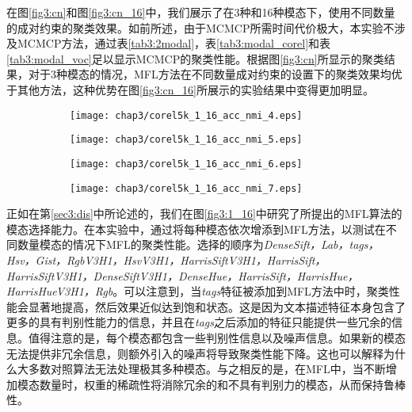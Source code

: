 在图\ref{fig3:cn}和图\ref{fig3:cn_16}中，我们展示了在3种和16种模态下，使用不同数量的成对约束的聚类效果。如前所述，由于MCMCP所需时间代价极大，本实验不涉及MCMCP方法，通过表\ref{tab3:2modal}，表\ref{tab3:modal_corel}和表\ref{tab3:modal_voc}足以显示MCMCP的聚类性能。根据图\ref{fig3:cn}所显示的聚类结果，对于3种模态的情况，MFL方法在不同数量成对约束的设置下的聚类效果均优于其他方法，这种优势在图\ref{fig3:cn_16}所展示的实验结果中变得更加明显。


\begin{figure}[t]
	\centering
	\begin{subfigure}{0.49\textwidth}
		\centering
		\texttt{[image: chap3/corel5k\_1\_16\_acc\_nmi\_4.eps]}
		\caption{}
		\label{fig3:1_16_acc_nmi_4}
	\end{subfigure}
	\begin{subfigure}{0.49\textwidth}
		\centering
		\texttt{[image: chap3/corel5k\_1\_16\_acc\_nmi\_5.eps]}
		\caption{}
		\label{fig3:1_16_acc_nmi_5}
    \end{subfigure}
    
	\centering
	\begin{subfigure}{0.49\textwidth}
		\centering
		\texttt{[image: chap3/corel5k\_1\_16\_acc\_nmi\_6.eps]}
		\caption{}
		\label{fig3:1_16_acc_nmi_6}
	\end{subfigure}
	\begin{subfigure}{0.49\textwidth}
		\centering
		\texttt{[image: chap3/corel5k\_1\_16\_acc\_nmi\_7.eps]}
		\caption{}
		\label{fig3:1_16_acc_nmi_7}
	\end{subfigure}
    \label{fig3:1_16_more}
\end{figure}

正如在第\ref{sec3:dis}中所论述的，我们在图\ref{fig3:1_16}中研究了所提出的MFL算法的模态选择能力。在本实验中，通过将每种模态依次增添到MFL方法，以测试在不同数量模态的情况下MFL的聚类性能。选择的顺序为\textit{DenseSift，Lab，tags，Hsv，Gist，RgbV3H1，HsvV3H1，HarrisSiftV3H1，HarrisSift，HarrisSiftV3H1，DenseSiftV3H1，DenseHue，HarrisSift，HarrisHue，HarrisHueV3H1，Rgb}。可以注意到，当\textit{tags}特征被添加到MFL方法中时，聚类性能会显著地提高，然后效果近似达到饱和状态。这是因为文本描述特征本身包含了更多的具有判别性能力的信息，并且在\textit{tags}之后添加的特征只能提供一些冗余的信息。值得注意的是，每个模态都包含一些判别性信息以及噪声信息。如果新的模态无法提供非冗余信息，则额外引入的噪声将导致聚类性能下降。这也可以解释为什么大多数对照算法无法处理极其多种模态。与之相反的是，在MFL中，当不断增加模态数量时，权重的稀疏性将消除冗余的和不具有判别力的模态，从而保持鲁棒性。

